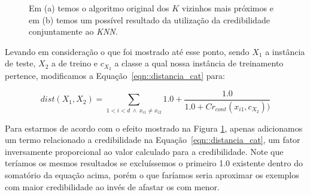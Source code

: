 \begin{figure}[ht]
\centering
{}
\caption{Em (a) temos o algoritmo original dos $K$ vizinhos mais próximos e em (b) temos um possível resultado da utilização da credibilidade conjuntamente ao \textit{KNN}.  
\label{fig::KNNantesedepois}}
\end{figure}

Levando em consideração o que foi mostrado até esse ponto, sendo $X_1$ a instância de teste, $X_2$ a de treino e $c_{X_2}$ a classe a qual nossa instância de treinamento pertence, modificamos a Equação~\ref{eqn::distancia_cat} para:

\begin{equation} \label{eqn::distancia_cat_cred}
   dist(X_1, X_2) = \sum_{1 < i < d \ \wedge \ x_{i1} \neq x_{i2}} 1.0 + \frac{1.0}{1.0 + Cr_{cont}(x_{i1}, c_{X_2} ))}
\end{equation}

Para estarmos de acordo com o efeito mostrado na Figura \ref{fig::KNNantesedepois}, apenas adicionamos um termo relacionado a credibilidade na Equação~\ref{eqn::distancia_cat}, um fator inversamente proporcional ao valor calculado para a credibilidade. Note que teríamos os mesmos resultados se excluíssemos o primeiro 1.0 existente dentro do somatório da equação acima, porém o que faríamos seria aproximar os exemplos com maior credibilidade ao invés de afastar os com menor.

